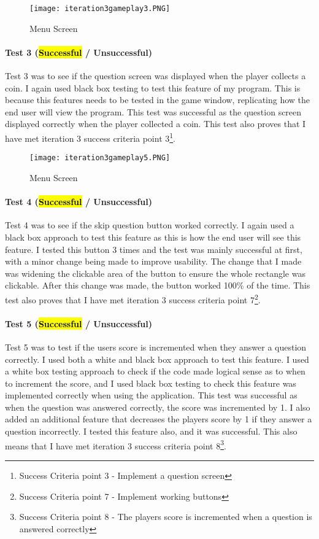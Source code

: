 \documentclass[12pt]{report}
\begin{document}
\begin{figure}[H]
    \centering
    \texttt{[image: iteration3gameplay3.PNG]}
    \caption{Menu Screen}
\end{figure}

\paragraph{Test 3 (\hl{Successful} / Unsuccessful)}
Test 3 was to see if the question screen was displayed when the player collects a coin. I again used black box testing to test this feature of my program. This is because this features needs to be tested in the game window, replicating how the end user will view the program. This test was successful as the question screen displayed correctly when the player collected a coin. This test also proves that I have met iteration 3 success criteria point 3\footnote{Success Criteria point 3 - Implement a question screen}.

\begin{figure}[H]
    \centering
    \texttt{[image: iteration3gameplay5.PNG]}
    \caption{Menu Screen}
\end{figure}

\paragraph{Test 4 (\hl{Successful} / Unsuccessful)}
Test 4 was to see if the skip question button worked correctly. I again used a black box approach to test this feature as this is how the end user will see this feature. I tested this button 3 times and the test was mainly successful at first, with a minor change being made to improve usability. The change that I made was widening the clickable area of the button to ensure the whole rectangle was clickable. After this change was made, the button worked 100\% of the time. This test also proves that I have met iteration 3 success criteria point 7\footnote{Success Criteria point 7 - Implement working buttons}.

\paragraph{Test 5 (\hl{Successful} / Unsuccessful)}
Test 5 was to test if the users score is incremented when they answer a question correctly. I used both a white and black box approach to test this feature. I used a white box testing approach to check if the code made logical sense as to when to increment the score, and I used black box testing to check this feature was implemented correctly when using the application. This test was successful as when the question was answered correctly, the score was incremented by 1. I also added an additional feature that decreases the players score by 1 if they answer a question incorrectly. I tested this feature also, and it was successful. This also means that I have met iteration 3 success criteria point 8\footnote{Success Criteria point 8 - The players score is incremented when a question is answered correctly}.
\end{document}
